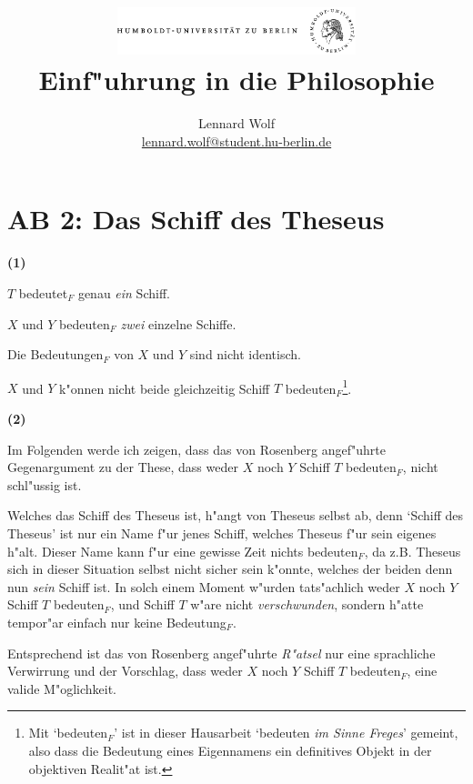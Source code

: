 \documentclass[a4paper]{article}
\date{\vspace{-3ex}}
\begin{document}
\title{
	\includegraphics*[width=0.52\textwidth]{images/hu_logo.png}\\
	\vspace{10pt}
	Einf"uhrung in die Philosophie}
\author{Lennard Wolf\\
        \href{mailto:lennard.wolf@student.hu-berlin.de}{lennard.wolf@student.hu-berlin.de}}
\maketitle


\section*{AB 2: Das Schiff des Theseus}
\large
\textbf{(1)}
\begin{description}[leftmargin=!,labelwidth=\widthof{\bfseries P22}]
  \item[P1] $T$ bedeutet$_{F}$ genau \emph{ein} Schiff.
  \item[P2] $X$ und $Y$ bedeuten$_{F}$ \emph{zwei} einzelne Schiffe.
  \item[P3] Die Bedeutungen$_{F}$ von $X$ und $Y$ sind nicht identisch.
  \item[K] $X$ und $Y$ k"onnen nicht beide gleichzeitig Schiff $T$ bedeuten$_{F}$\footnote{Mit `bedeuten$_{F}$' ist in dieser Hausarbeit `bedeuten \emph{im Sinne Freges}' gemeint, also dass die Bedeutung eines Eigennamens ein definitives Objekt in der objektiven Realit"at ist. }.
\end{description}
\vspace{8pt}
\textbf{(2)}

Im Folgenden werde ich zeigen, dass das von Rosenberg angef"uhrte Gegenargument zu der These, dass weder $X$ noch $Y$ Schiff $T$ bedeuten$_{F}$, nicht schl"ussig ist. 

Welches das Schiff des Theseus ist, h"angt von Theseus selbst ab, denn `Schiff des Theseus' ist nur ein Name f"ur jenes Schiff, welches Theseus f"ur sein eigenes h"alt. Dieser Name kann f"ur eine gewisse Zeit nichts bedeuten$_{F}$, da z.B. Theseus sich in dieser Situation selbst nicht sicher sein k"onnte, welches der beiden denn nun \emph{sein} Schiff ist. In solch einem Moment w"urden tats"achlich weder $X$ noch $Y$ Schiff $T$ bedeuten$_{F}$, und Schiff $T$ w"are nicht \emph{verschwunden}, sondern h"atte tempor"ar einfach nur keine Bedeutung$_{F}$.

Entsprechend ist das von Rosenberg angef"uhrte \emph{R"atsel} nur eine sprachliche Verwirrung und der Vorschlag, dass weder $X$ noch $Y$ Schiff $T$ bedeuten$_{F}$, eine valide M"oglichkeit.
\end{document}
